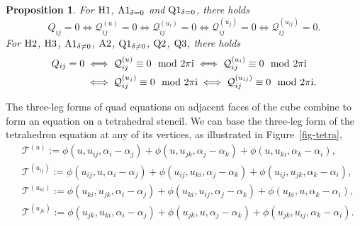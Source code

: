 \documentclass[pdftex]{sigma}
\newtheorem{Proposition}[Definition]{Proposition}
\numberwithin{equation}{section}
\begin{document}
\begin{Proposition} \label{prop-three-leg-quad}
 For ${\rm H}1$, ${\rm A}1_{\delta=0}$ and ${\rm Q}1_{\delta=0}$, there holds
 \[ Q_{ij} = 0 \iff \mathcal{Q}_{ij}^{(u)} = 0 \iff \mathcal{Q}_{ij}^{(u_i)} = 0 \iff \mathcal{Q}_{ij}^{(u_j)} = 0 \iff \mathcal{Q}_{ij}^{(u_{ij})} = 0 .\]
 For ${\rm H}2$, ${\rm H}3$, ${\rm A}1_{\delta\neq0}$, ${\rm A}2$, ${\rm Q}1_{\delta\neq0}$, ${\rm Q}2$, ${\rm Q}3$, there holds
 \begin{align*} Q_{ij} = 0 &\iff \mathcal{Q}_{ij}^{(u)} \equiv 0 \mod 2 \pi {\rm i} \iff \mathcal{Q}_{ij}^{(u_i)} \equiv 0 \mod 2 \pi {\rm i} \\
 &\iff \mathcal{Q}_{ij}^{(u_j)} \equiv 0 \mod 2 \pi {\rm i} \iff
 \mathcal{Q}_{ij}^{(u_{ij})} \equiv 0 \mod 2 \pi {\rm i} .
 \end{align*}
\end{Proposition}

The three-leg forms of quad equations on adjacent faces of the cube combine to form an equation on a tetrahedral stencil. We can base the three-leg form of the tetrahedron equation at any of its vertices, as illustrated in Figure~\ref{fig-tetra},
\begin{align}
 &\mathcal{T}^{(u)}:= \phi(u,u_{ij},\alpha_i-\alpha_j) + \phi(u,u_{jk},\alpha_j-\alpha_k) + \phi(u,u_{ki},\alpha_k-\alpha_i) , \label{tetra-u}\\
	&\mathcal{T}^{(u_{ij})}:= \phi(u_{ij},u,\alpha_i-\alpha_j) + \phi(u_{ij},u_{ki},\alpha_j-\alpha_k) + \phi(u_{ij},u_{jk}, \alpha_k-\alpha_i) , \label{tetra-uij}\\
	&\mathcal{T}^{(u_{ki})}:= \phi(u_{ki},u_{jk},\alpha_i-\alpha_j) + \phi(u_{ki},u_{ij},\alpha_j-\alpha_k) + \phi(u_{ki},u, \alpha_k-\alpha_i) , \label{tetra-uki}\\
	&\mathcal{T}^{(u_{jk})}:= \phi(u_{jk},u_{ki},\alpha_i-\alpha_j) + \phi(u_{jk},u,\alpha_j-\alpha_k) + \phi(u_{jk},u_{ij}, \alpha_k-\alpha_i) . \label{tetra-ujk}
\end{align}
\end{document}
